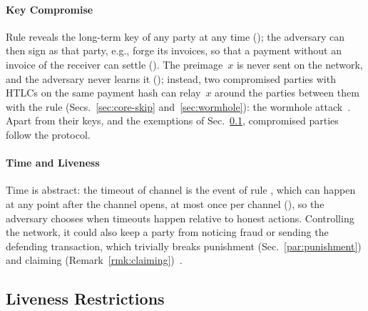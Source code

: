 \paragraph{Key Compromise} Rule  reveals the long-term key of any party at
any time (); the adversary can then sign as that party, e.g., forge its
invoices, so that a payment without an invoice of the receiver can settle
(). The preimage~$x$ is never sent on the network,
and the adversary never learns it (); instead, two compromised parties
with HTLCs on the same payment hash can relay~$x$ around the parties between them with the rule
 (Secs.~\ref{sec:core-skip} and~\ref{sec:wormhole}): the wormhole attack~\cite{malavolta2019}. Apart
from their keys,  and the exemptions of Sec.~\ref{sec:restrictions},
compromised parties follow the protocol.

\paragraph{Time and Liveness} Time is abstract: the timeout of channel  is the event
 of rule , which can happen at any point after the channel
opens, at most once per channel (), so the adversary chooses when
timeouts happen relative to honest actions. Controlling the network, it could also keep a party
from noticing fraud or sending the defending transaction, which trivially breaks
punishment (Sec.~\ref{par:punishment}) and claiming (Remark~\ref{rmk:claiming})~\cite{mccorry2019}.

\subsection{Liveness Restrictions}\label{sec:restrictions}

